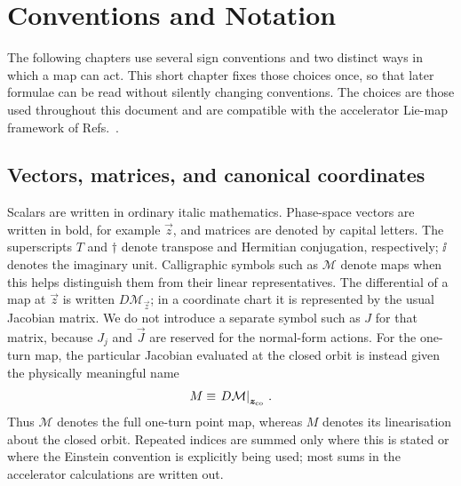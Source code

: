 \chapter{Conventions and Notation}
\label{chap:conventions}

The following chapters use several sign conventions and two distinct ways in
which a map can act.  This short chapter fixes those choices once, so that later
formulae can be read without silently changing conventions.  The choices are
those used throughout this document and are compatible with the accelerator
Lie-map framework of Refs.~\cite{DragtFinn1976,DragtForest1983,Forest_book1,Forest_book2}.



\section{Vectors, matrices, and canonical coordinates}

Scalars are written in ordinary italic mathematics.  Phase-space vectors are
written in bold, for example $\vec z$, and matrices are denoted by capital
letters.  The superscripts $T$ and $\dagger$ denote transpose and Hermitian
conjugation, respectively; $\ii$ denotes the imaginary unit.  Calligraphic
symbols such as $\mathcal M$ denote maps when this helps distinguish them
from their linear representatives.  The differential of a map at $\vec z$ is written
$D\mathcal M_{\vec z}$; in a coordinate chart it is represented by the usual
Jacobian matrix.  We do not introduce a separate symbol such as $J$ for that
matrix, because $J_j$ and $\vec J$ are reserved for the normal-form actions.
For the one-turn map, the particular Jacobian evaluated at the closed orbit is
instead given the physically meaningful name
\begin{equation}\label{eq:conv-one-turn-matrix}
    M \equiv \left.D\mathcal M\right|_{\vec z_{\rm co}}\,.
\end{equation}
Thus $\mathcal M$ denotes the full one-turn point map, whereas $M$ denotes its
linearisation about the closed orbit.  Repeated indices are summed only where
this is stated or where the Einstein convention is explicitly being used; most
sums in the accelerator calculations are written out.

